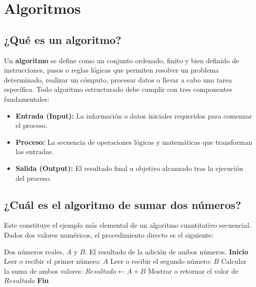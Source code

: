 \documentclass[12pt]{article}
\begin{document}
\newpage
\section{Algoritmos}

\subsection{¿Qué es un algoritmo?}
Un \textbf{algoritmo} se define como un conjunto ordenado, finito y bien definido de instrucciones, pasos o reglas lógicas que permiten resolver un problema determinado, realizar un cómputo, procesar datos o llevar a cabo una tarea específica. Todo algoritmo estructurado debe cumplir con tres componentes fundamentales:
\begin{itemize}
    \item \textbf{Entrada (Input):} La información o datos iniciales requeridos para comenzar el proceso.
    \item \textbf{Proceso:} La secuencia de operaciones lógicas y matemáticas que transforman las entradas.
    \item \textbf{Salida (Output):} El resultado final u objetivo alcanzado tras la ejecución del proceso.
\end{itemize}

\subsection{¿Cuál es el algoritmo de sumar dos números?}
Este constituye el ejemplo más elemental de un algoritmo cuantitativo secuencial. Dados dos valores numéricos, el procedimiento directo es el siguiente:
\begin{algorithm}[H]
\caption{Suma de dos números}
\begin{algorithmic}[1]
    \Require Dos números reales, $A$ y $B$.
    \Ensure El resultado de la adición de ambos números.
    \State \textbf{Inicio}
    \State Leer o recibir el primer número: $A$
    \State Leer o recibir el segundo número: $B$
    \State Calcular la suma de ambos valores: $Resultado \leftarrow A + B$
    \State Mostrar o retornar el valor de $Resultado$
    \State \textbf{Fin}
\end{algorithmic}
\end{algorithm}
\end{document}
